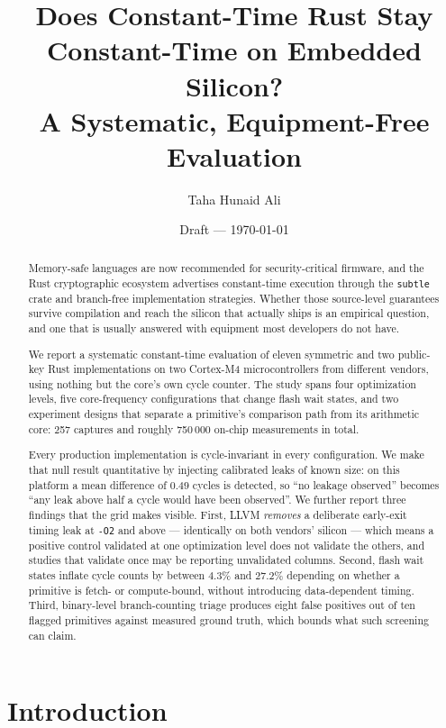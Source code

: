 \documentclass[11pt,a4paper]{article}
\title{Does Constant-Time Rust Stay Constant-Time on Embedded Silicon?\\
       A Systematic, Equipment-Free Evaluation}
\author{Taha Hunaid Ali}
\date{Draft --- \today}
\begin{document}
\maketitle

\begin{abstract}
Memory-safe languages are now recommended for security-critical firmware, and
the Rust cryptographic ecosystem advertises constant-time execution through the
\texttt{subtle} crate and branch-free implementation strategies. Whether those
source-level guarantees survive compilation and reach the silicon that actually
ships is an empirical question, and one that is usually answered with equipment
most developers do not have.

We report a systematic constant-time evaluation of eleven symmetric and two
public-key Rust implementations on two Cortex-M4 microcontrollers from different
vendors, using nothing but the core's own cycle counter. The study spans four
optimization levels, five core-frequency configurations that change flash wait
states, and two experiment designs that separate a primitive's comparison path
from its arithmetic core: 257 captures and roughly 750\,000 on-chip
measurements in total.

Every production implementation is cycle-invariant in every configuration. We
make that null result quantitative by injecting calibrated leaks of known size:
on this platform a mean difference of $0.49$ cycles is detected, so ``no leakage
observed'' becomes ``any leak above half a cycle would have been observed''. We
further report three findings that the grid makes visible. First, LLVM
\emph{removes} a deliberate early-exit timing leak at \texttt{-O2} and above ---
identically on both vendors' silicon --- which means a positive control
validated at one optimization level does not validate the others, and studies
that validate once may be reporting unvalidated columns. Second, flash wait
states inflate cycle counts by between $4.3\%$ and $27.2\%$ depending on whether
a primitive is fetch- or compute-bound, without introducing data-dependent
timing. Third, binary-level branch-counting triage produces eight false
positives out of ten flagged primitives against measured ground truth, which
bounds what such screening can claim.
\end{abstract}

\section{Introduction}
\end{document}
